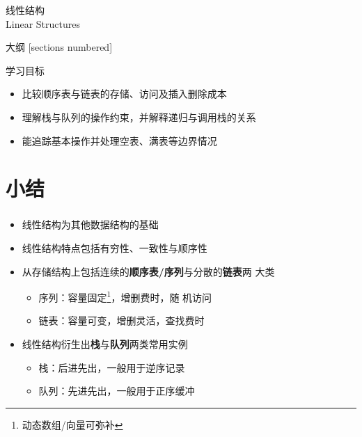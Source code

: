 \begin{standout}[第一章]
    线性结构\\
    Linear Structures
\end{standout}

\begin{frame}{大纲}
    [sections numbered]
    \tableofcontents
\end{frame}

\begin{frame}{学习目标}
    \begin{itemize}
        \item 比较顺序表与链表的存储、访问及插入删除成本
        \item 理解栈与队列的操作约束，并解释递归与调用栈的关系
        \item 能追踪基本操作并处理空表、满表等边界情况
    \end{itemize}
\end{frame}





\section{小结}

\begin{frame}
    \frametitle{\insertsectionhead}
    \begin{itemize}
        \item 线性结构为其他数据结构的基础
        \item 线性结构特点包括\alert{有穷性}、\alert{一致性}与\alert{顺序性}
        \item 从存储结构上包括连续的\textbf{顺序表/序列}与分散的\textbf{链表}两
              大类
            \begin{itemize}
                \item 序列：容量固定\footnote{动态数组/向量可弥补}，增删费时，随
                      机访问
                \item 链表：容量可变，增删灵活，查找费时
            \end{itemize}
        \item 线性结构衍生出\textbf{栈}与\textbf{队列}两类常用实例
            \begin{itemize}
                \item 栈：后进先出，一般用于逆序记录
                \item 队列：先进先出，一般用于正序缓冲
            \end{itemize}
    \end{itemize}
\end{frame}

